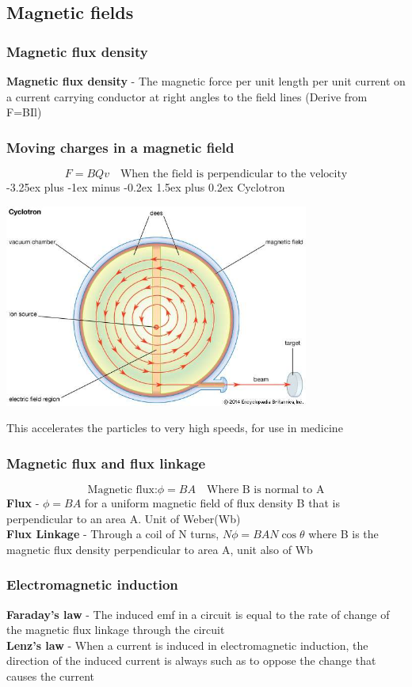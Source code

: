 \documentclass[12pt]{article}
\makeatletter
\renewcommand{\paragraph}{\@startsection{paragraph}{4}{0ex}%
    {-3.25ex plus -1ex minus -0.2ex}%
    {1.5ex plus 0.2ex}%
    {\normalfont\normalsize\bfseries}}
\makeatother
\begin{document}
\subsection{Magnetic fields}
\subsubsection{Magnetic flux density}
\textbf{Magnetic flux density} - The magnetic force per unit length per unit current on a current carrying conductor at right angles to the field lines (Derive from F=BIl)
\subsubsection{Moving charges in a magnetic field}
$$F=BQv \quad \textrm{When the field is perpendicular to the velocity}$$
\paragraph{Cyclotron}
\begin{center}
\includegraphics[width=10cm]{cyclotron.jpg}
\end{center}
This accelerates the particles to very high speeds, for use in medicine
\subsubsection{Magnetic flux and flux linkage}
$$\textrm{Magnetic flux:}\phi=BA \quad \textrm{Where B is normal to A}$$
\textbf{Flux} - $\phi=BA$ for a uniform magnetic field of flux density B that is perpendicular to an area A. Unit of Weber(Wb)\\
\textbf{Flux Linkage} - Through a coil of N turns, $N\phi=BAN\cos\theta$ where B is the magnetic flux density perpendicular to area A, unit also of Wb
\subsubsection{Electromagnetic induction}
\textbf{Faraday's law} - The induced emf in a circuit is equal to the rate of change of the magnetic flux linkage through the circuit\\
\textbf{Lenz's law} - When a current is induced in electromagnetic induction, the direction of the induced current is always such as to oppose the change that causes the current
\end{document}
